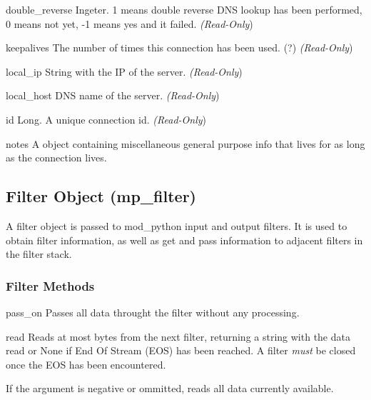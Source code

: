 \begin{memberdesc}[connection]{double_reverse}
Ingeter. 1 means double reverse DNS lookup has been performed, 0 means
not yet, -1 means yes and it failed.
\emph{(Read-Only})
\end{memberdesc}

\begin{memberdesc}[connection]{keepalives}
The number of times this connection has been used. (?)
\emph{(Read-Only})
\end{memberdesc}

\begin{memberdesc}[connection]{local_ip}
String with the IP of the server.
\emph{(Read-Only})
\end{memberdesc}

\begin{memberdesc}[connection]{local_host}
DNS name of the server.
\emph{(Read-Only})
\end{memberdesc}

\begin{memberdesc}[connection]{id}
Long. A unique connection id.
\emph{(Read-Only})
\end{memberdesc}

\begin{memberdesc}[connection]{notes}
A  object containing miscellaneous general purpose info that lives for
as long as the connection lives. 
\end{memberdesc}

\subsection{Filter Object (mp_filter)\label{pyapi-mpfilt}}

A filter object is passed to mod_python input and output filters. It
is used to obtain filter information, as well as get and pass
information to adjacent filters in the filter stack.

\subsubsection{Filter Methods\label{pyapi-mpfilt-meth}}

\begin{methoddesc}[filter]{pass_on}{}
Passes all data throught the filter without any processing.
\end{methoddesc}

\begin{methoddesc}[filter]{read}{}
Reads at most  bytes from the next filter, returning a string
with the data read or None if End Of Stream (EOS) has been reached. A
filter \emph{must} be closed once the EOS has been encountered.

If the  argument is negative or ommitted, reads all data
currently available.
\end{methoddesc}

